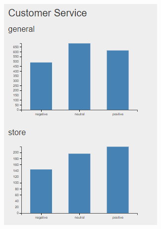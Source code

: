 \documentclass[10pt,a4paper]{article}
\begin{document}
		\FloatBarrier
		\begin{figure}[!h]
		  \centering
		  \begin{minipage}[b]{0.455\textwidth}
		    \includegraphics[width=\textwidth]{data/custService1}
		  \end{minipage}
		  \hfill
		  \begin{minipage}[b]{0.48\textwidth}

\end{minipage}
\end{figure}
\end{document}
